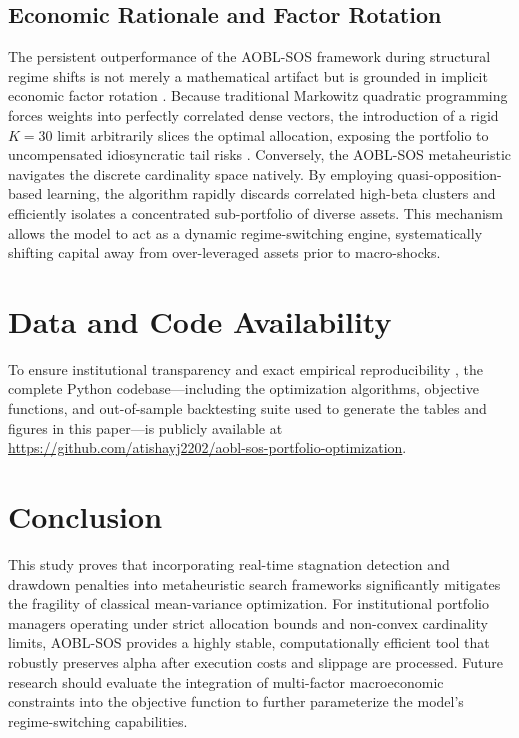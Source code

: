 \documentclass[11pt,a4paper]{article}
\begin{document}
\subsection{Economic Rationale and Factor Rotation}
The persistent outperformance of the AOBL-SOS framework during structural regime shifts is not merely a mathematical artifact but is grounded in implicit economic factor rotation \cite{fama1993, asness2013}. Because traditional Markowitz quadratic programming forces weights into perfectly correlated dense vectors, the introduction of a rigid $K=30$ limit arbitrarily slices the optimal allocation, exposing the portfolio to uncompensated idiosyncratic tail risks \cite{carhart1997}. Conversely, the AOBL-SOS metaheuristic navigates the discrete cardinality space natively. By employing quasi-opposition-based learning, the algorithm rapidly discards correlated high-beta clusters and efficiently isolates a concentrated sub-portfolio of diverse assets. This mechanism allows the model to act as a dynamic regime-switching engine, systematically shifting capital away from over-leveraged assets prior to macro-shocks.



\section{Data and Code Availability}
To ensure institutional transparency and exact empirical reproducibility \cite{harvey2016}, the complete Python codebase—including the optimization algorithms, objective functions, and out-of-sample backtesting suite used to generate the tables and figures in this paper—is publicly available at \url{https://github.com/atishayj2202/aobl-sos-portfolio-optimization}.

\section{Conclusion}
This study proves that incorporating real-time stagnation detection and drawdown penalties into metaheuristic search frameworks significantly mitigates the fragility of classical mean-variance optimization. For institutional portfolio managers operating under strict allocation bounds and non-convex cardinality limits, AOBL-SOS provides a highly stable, computationally efficient tool that robustly preserves alpha after execution costs and slippage are processed. Future research should evaluate the integration of multi-factor macroeconomic constraints \cite{ang2006} into the objective function to further parameterize the model's regime-switching capabilities.
\end{document}
